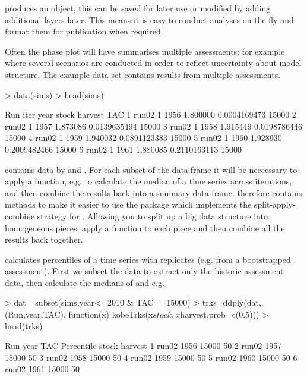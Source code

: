 \documentclass[shortnames,nojss,article]{jss}
\begin{document}
 produces an object, this can be saved for later use or modified by adding additional layers later.
This means it is easy to conduct analyses on the fly and format them for publication when required.

Often the phase plot will have summarises multiple assessments; for example where several scenarios are conducted in order to
reflect uncertainty about model structure. The example data set contains results from multiple assessments.

\begin{Schunk}
\begin{Sinput}
> data(sims)
> head(sims)
\end{Sinput}
\begin{Soutput}
    Run iter year    stock      harvest   TAC
1 run02    1 1956 1.800000 0.0004169473 15000
2 run02    1 1957 1.873086 0.0139635494 15000
3 run02    1 1958 1.915449 0.0198786446 15000
4 run02    1 1959 1.940032 0.0891123383 15000
5 run02    1 1960 1.928930 0.2009482466 15000
6 run02    1 1961 1.880085 0.2110163113 15000
\end{Soutput}
\end{Schunk}

 contains data by  and . For each subset of the data.frame it will be neccessary to
apply a function, e.g. to calculate the median of a time series across iterations, and then combine the results back into a summary data frame.
 therefore contains methods to make it easier to use the  package which implements the split-apply-combine strategy for .
Allowing you 
to split up a big data structure into homogeneous pieces, apply a function to each piece and then combine all the results back together. 

 calculates percentiles of a time series with replicates (e.g. from a bootstrapped assessment).
First we subset the data to extract only the historic assessment data, then calculate the medians of  and  e.g.

\begin{Schunk}
\begin{Sinput}
> dat =subset(sims,year<=2010 & TAC==15000)
> trks=ddply(dat,.(Run,year,TAC), function(x) kobeTrks(x$stock,x$harvest,prob=c(0.5)))
> head(trks)
\end{Sinput}
\begin{Soutput}
    Run year   TAC Percentile    stock      harvest
1 run02 1956 15000        50%
2 run02 1957 15000        50%
3 run02 1958 15000        50%
4 run02 1959 15000        50%
5 run02 1960 15000        50%
6 run02 1961 15000        50%
\end{Soutput}
\end{Schunk}
            
\end{document}
